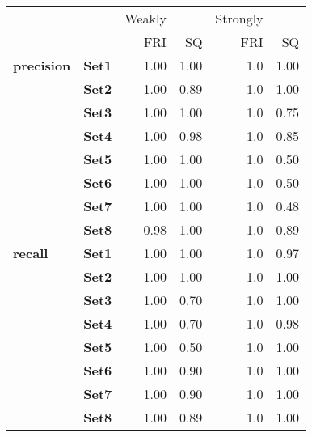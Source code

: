 \begin{tabular}{llrrrr}
\toprule
       &      & Weakly &       & Strongly &       \\
       &      &    FRI &    SQ &      FRI &    SQ \\
\midrule
\textbf{precision} & \textbf{Set1} &   1.00 &  1.00 &      1.0 &  1.00 \\
       & \textbf{Set2} &   1.00 &  0.89 &      1.0 &  1.00 \\
       & \textbf{Set3} &   1.00 &  1.00 &      1.0 &  0.75 \\
       & \textbf{Set4} &   1.00 &  0.98 &      1.0 &  0.85 \\
       & \textbf{Set5} &   1.00 &  1.00 &      1.0 &  0.50 \\
       & \textbf{Set6} &   1.00 &  1.00 &      1.0 &  0.50 \\
       & \textbf{Set7} &   1.00 &  1.00 &      1.0 &  0.48 \\
       & \textbf{Set8} &   0.98 &  1.00 &      1.0 &  0.89 \\
\textbf{recall} & \textbf{Set1} &   1.00 &  1.00 &      1.0 &  0.97 \\
       & \textbf{Set2} &   1.00 &  1.00 &      1.0 &  1.00 \\
       & \textbf{Set3} &   1.00 &  0.70 &      1.0 &  1.00 \\
       & \textbf{Set4} &   1.00 &  0.70 &      1.0 &  0.98 \\
       & \textbf{Set5} &   1.00 &  0.50 &      1.0 &  1.00 \\
       & \textbf{Set6} &   1.00 &  0.90 &      1.0 &  1.00 \\
       & \textbf{Set7} &   1.00 &  0.90 &      1.0 &  1.00 \\
       & \textbf{Set8} &   1.00 &  0.89 &      1.0 &  1.00 \\
\bottomrule
\end{tabular}
